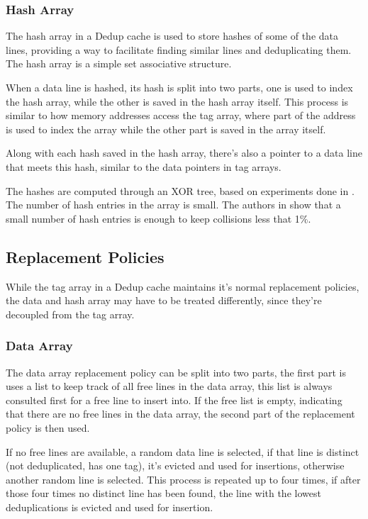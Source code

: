 \subsubsection{Hash Array}
\label{sssec:DedupHash}
The hash array in a Dedup cache is used to store hashes of some of the data lines, providing a way to facilitate finding similar lines and deduplicating them. The hash array is a simple set associative structure.\par
When a data line is hashed, its hash is split into two parts, one is used to index the hash array, while the other is saved in the hash array itself. This process is similar to how memory addresses access the tag array, where part of the address is used to index the array while the other part is saved in the array itself.\par
Along with each hash saved in the hash array, there's also a pointer to a data line that meets this hash, similar to the data pointers in tag arrays.\par
The hashes are computed through an XOR tree, based on experiments done in \cite{dedup}. The number of hash entries in the array is small. The authors in \cite{dedup} show that a small number of hash entries is enough to keep collisions less that 1\%.

\subsection{Replacement Policies}
\label{ssec:DedupRepl}
While the tag array in a Dedup cache maintains it's normal replacement policies, the data and hash array may have to be treated differently, since they're decoupled from the tag array.
\subsubsection{Data Array}
\label{sssec:DedupDataRepl}
The data array replacement policy can be split into two parts, the first part is uses a list to keep track of all free lines in the data array, this list is always consulted first for a free line to insert into. If the free list is empty, indicating that there are no free lines in the data array, the second part of the replacement policy is then used.\par
If no free lines are available, a random data line is selected, if that line is distinct (not deduplicated, has one tag), it's evicted and used for insertions, otherwise another random line is selected. This process is repeated up to four times, if after those four times no distinct line has been found, the line with the lowest deduplications is evicted and used for insertion.
